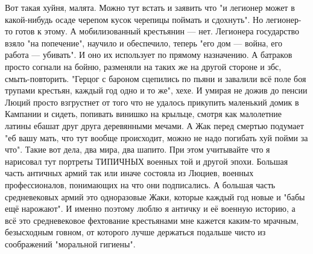Вот такая хуйня, малята. Можно тут встать и заявить что "и легионер может в какой-нибудь осаде черепом кусок черепицы поймать и сдохнуть". Но легионер-то готов к этому. А мобилизованный крестьянин — нет. Легионера государство взяло "на попечение", научило и обеспечило, теперь "его дом — война, его работа — убивать". И оно их использует по прямому назначению. А батраков просто согнали на бойню, разменяли на таких же на другой стороне и збс, смыть-повторить. "Герцог с бароном сцепились по пьяни и завалили всё поле боя трупами крестьян, каждый год одно и то же", хехе. И умирая не дожив до пенсии Люций просто взгрустнет от того что не удалось прикупить маленький домик в Кампании и сидеть, попивать винишко на крыльце, смотря как малолетние латины ебашат друг друга деревянными мечами. А Жак перед смертью подумает "еб вашу мать, что тут вообще происходит, можно не надо погибать хуй пойми за что". Такие вот дела, два мира, два шапито. При этом учитывайте что я нарисовал тут портреты ТИПИЧНЫХ военных той и другой эпохи. Большая часть античных армий так или иначе состояла из Люциев, военных профессионалов, понимающих на что они подписались. А большая часть средневековых армий это одноразовые Жаки, которые каждый год новые и "бабы ещё нарожают". И именно поэтому люблю я античку и её военную историю, а всё это средневековое фехтование крестьянами мне кажется каким-то мрачным, безысходным говном, от которого лучше держаться подальше чисто из соображений "моральной гигиены".

